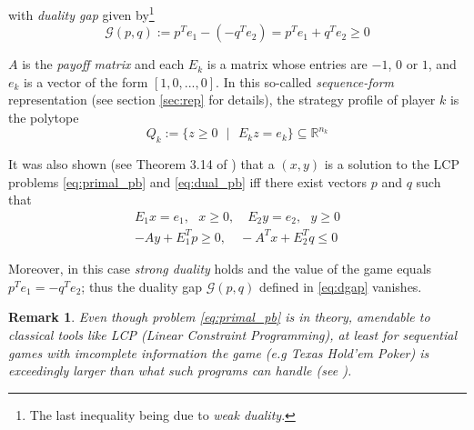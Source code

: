 \documentclass{article} %
\newtheorem{remark}{Remark}
\begin{document}
with \textit{duality gap} given by\footnote{The last inequality being due to \textit{weak duality}.}
\begin{equation}
  \mathcal{G}(p, q) := p^Te_1 - (-q^Te_2) = p^Te_1 + q^Te_2 \geq 0
  \label{eq:dgap}
\end{equation}

$A$ is the \textit{payoff matrix} and each $E_k$ is a matrix whose entries are $-1$, $0$ or $1$, and $e_k$ is a vector of the form $[1, 0, ..., 0]$. In this so-called \textit{sequence-form} representation (see section \ref{sec:rep} for details), the strategy profile of player $k$ is the polytope
\begin{equation}
  Q_k := \{z \ge 0\text{ }|\text{ }E_kz = e_k\} \subseteq \mathbb{R}^{n_k}
\label{eq:polytope}
\end{equation}

It was also shown (see Theorem 3.14 of \cite{vonequilibrium}) that a $(x, y)$ is a solution to the LCP problems \eqref{eq:primal_pb} and \eqref{eq:dual_pb} iff there exist vectors $p$ and $q$ such that
\begin{equation}
  \begin{split}
    E_1x = e_1,\text{ }x \geq 0,\hspace{1em} E_2y = e_2,\text{ }y \geq 0\\
    -Ay + E_1^Tp \geq 0,\hspace{1em}-A^Tx + E_2^Tq \leq 0
    \end{split}
\end{equation}

Moreover, in this case \textit{strong duality} holds and the value of the game equals $p^Te_1 = -q^Te_2$; thus the duality gap $\mathcal{G}(p, q)$ defined in \eqref{eq:dgap} vanishes.


\begin{remark}  
  Even though problem \eqref{eq:primal_pb} is in theory, amendable to classical tools like LCP (\textit{Linear Constraint Programming}), at least for sequential games with imcomplete information the game (e.g Texas Hold'em Poker) is exceedingly larger than what such programs can handle (see \cite{hoda2010smoothing}).
\end{remark}
\end{document}
